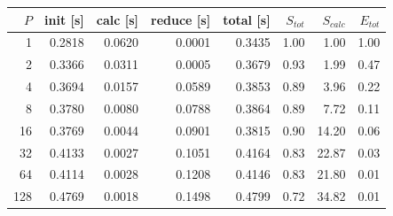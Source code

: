 \begin{tabular}{rrrrrrrr}
\hline
$P$ & init [s] & calc [s] & reduce [s] & total [s] & $S_{tot}$ & $S_{calc}$ & $E_{tot}$ \\
\hline
1 & 0.2818 & 0.0620 & 0.0001 & 0.3435 & 1.00 & 1.00 & 1.00 \\
2 & 0.3366 & 0.0311 & 0.0005 & 0.3679 & 0.93 & 1.99 & 0.47 \\
4 & 0.3694 & 0.0157 & 0.0589 & 0.3853 & 0.89 & 3.96 & 0.22 \\
8 & 0.3780 & 0.0080 & 0.0788 & 0.3864 & 0.89 & 7.72 & 0.11 \\
16 & 0.3769 & 0.0044 & 0.0901 & 0.3815 & 0.90 & 14.20 & 0.06 \\
32 & 0.4133 & 0.0027 & 0.1051 & 0.4164 & 0.83 & 22.87 & 0.03 \\
64 & 0.4114 & 0.0028 & 0.1208 & 0.4146 & 0.83 & 21.80 & 0.01 \\
128 & 0.4769 & 0.0018 & 0.1498 & 0.4799 & 0.72 & 34.82 & 0.01 \\
\hline
\end{tabular}
